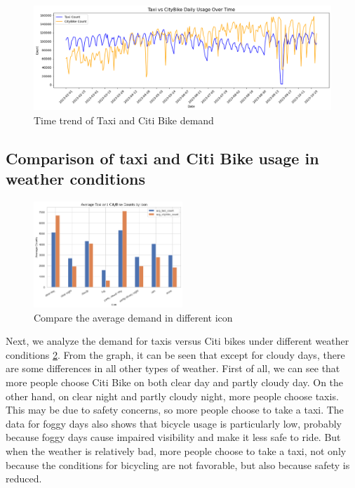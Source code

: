\documentclass[11pt]{article}
\begin{document}
\begin{figure}[h!]
    \centering
    \includegraphics[width=1\textwidth]{plot/timeseries.png}
    \caption{Time trend of Taxi and Citi Bike demand}
    \label{fig:1}
\end{figure}

\subsection{Comparison of taxi and Citi Bike usage in weather conditions}
\begin{figure}[h!]
    \centering
    \includegraphics[width=0.5\textwidth]{plot/icon compare taxi and citi bike.png}
    \caption{Compare the average demand in different icon}
    \label{fig:2}
\end{figure}

Next, we analyze the demand for taxis versus Citi bikes under different weather conditions \ref{fig:2}. From the graph, it can be seen that except for cloudy days, there are some differences in all other types of weather. First of all, we can see that more people choose Citi Bike on both clear day and partly cloudy day. On the other hand, on clear night and partly cloudy night, more people choose taxis. This may be due to safety concerns, so more people choose to take a taxi. The data for foggy days also shows that bicycle usage is particularly low, probably because foggy days cause impaired visibility and make it less safe to ride.  But when the weather is relatively bad, more people choose to take a taxi, not only because the conditions for bicycling are not favorable, but also because safety is reduced.
\end{document}
